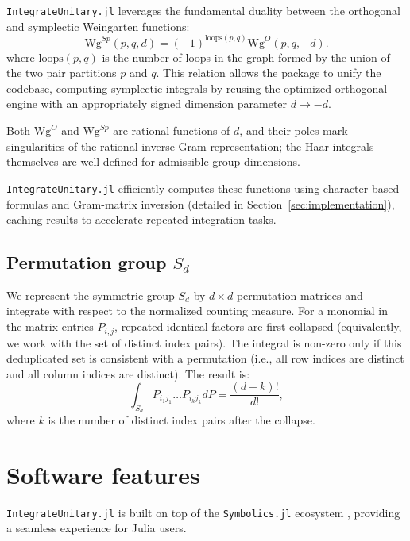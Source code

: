 \documentclass[manuscript,screen]{acmart}
\begin{document}
\texttt{IntegrateUnitary.jl} leverages the fundamental duality between the orthogonal and
symplectic Weingarten functions:
    \begin{equation}
    \mathrm{Wg}^{Sp}(p, q, d) = (-1)^{\mathrm{loops}(p, q)} \mathrm{Wg}^O(p, q, -d).
    \end{equation}
where $\mathrm{loops}(p, q)$ is the number of loops in the graph formed by the
union of the two pair partitions $p$ and $q$. This relation allows the package
to unify the codebase, computing symplectic integrals by reusing the optimized
orthogonal engine with an appropriately signed dimension parameter $d \to -d$.

Both $\mathrm{Wg}^O$ and $\mathrm{Wg}^{Sp}$ are rational functions of $d$, and
their poles mark singularities of the rational inverse-Gram representation; the
Haar integrals themselves are well defined for admissible group dimensions.

\texttt{IntegrateUnitary.jl} efficiently computes these functions using character-based
formulas and Gram-matrix inversion (detailed in Section~\ref{sec:implementation}),
caching results to accelerate repeated integration tasks.

\subsection{Permutation group $S_d$}
We represent the symmetric group $S_d$ by $d \times d$ permutation matrices and
integrate with respect to the normalized counting measure. For a
monomial in the matrix entries $P_{i,j}$, repeated identical factors are first
collapsed (equivalently, we work with the set of distinct index pairs). The
integral is non-zero only if this deduplicated set is consistent with a
permutation (i.e., all row indices are distinct and all column indices are
distinct). The result is:
\begin{equation}
\int_{S_d} P_{i_1 j_1} \dots P_{i_k j_k} dP = \frac{(d-k)!}{d!},
\end{equation}
where $k$ is the number of distinct index pairs after the collapse.

\section{Software features}
\label{sec:features}
\texttt{IntegrateUnitary.jl} is built on top of the \texttt{Symbolics.jl} ecosystem
\cite{symbolicsjl}, providing a seamless experience for Julia users.
\end{document}
